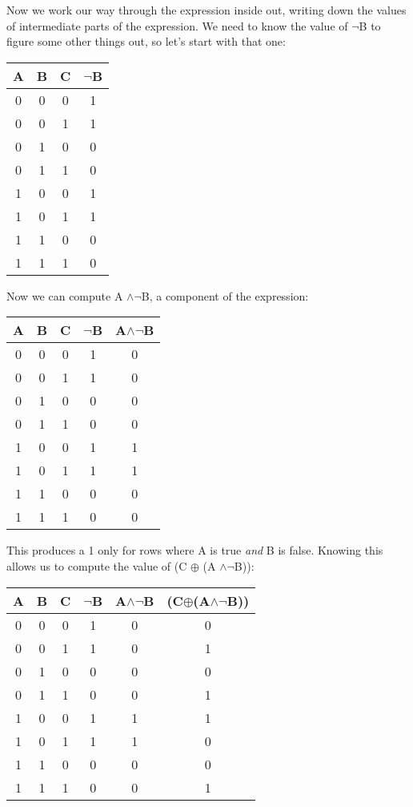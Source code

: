 Now we work our way through the expression inside out, writing down the
values of intermediate parts of the expression. We need to know the value
of $\neg$B to figure some other things out, so let's start with that one:
\begin{nobreak}
\begin{center}
\begin{tabular}{c c c|c}
A & B & C & $\neg$B \\
\hline
0 & 0 & 0 & 1 \\
0 & 0 & 1 & 1 \\
0 & 1 & 0 & 0 \\
0 & 1 & 1 & 0 \\
1 & 0 & 0 & 1 \\
1 & 0 & 1 & 1 \\
1 & 1 & 0 & 0 \\
1 & 1 & 1 & 0 \\
\end{tabular}
\end{center}
\end{nobreak}
\pagebreak
\begin{nobreak}
Now we can compute A $\wedge \neg$B, a component of the expression:
\begin{center}
\begin{tabular}{c c c|c c}
A & B & C & $\neg$B & A$\wedge \neg$B\\
\hline
0 & 0 & 0 & 1 & 0 \\
0 & 0 & 1 & 1 & 0 \\
0 & 1 & 0 & 0 & 0 \\
0 & 1 & 1 & 0 & 0 \\
1 & 0 & 0 & 1 & 1 \\
1 & 0 & 1 & 1 & 1 \\
1 & 1 & 0 & 0 & 0 \\
1 & 1 & 1 & 0 & 0 \\
\end{tabular}
\end{center}
\end{nobreak}
This produces a 1 only for rows where A is true \textit{and} B is false.
Knowing this allows us to compute the value of (C $\oplus$ (A $\wedge
\neg$B)):
\begin{nobreak}
\begin{center}
\begin{tabular}{c c c|c c c}
A & B & C & $\neg$B & A$\wedge \neg$B & (C$\oplus$(A$\wedge \neg$B)) \\
\hline
0 & 0 & 0 & 1 & 0 & 0 \\
0 & 0 & 1 & 1 & 0 & 1 \\
0 & 1 & 0 & 0 & 0 & 0 \\
0 & 1 & 1 & 0 & 0 & 1 \\
1 & 0 & 0 & 1 & 1 & 1 \\
1 & 0 & 1 & 1 & 1 & 0 \\
1 & 1 & 0 & 0 & 0 & 0 \\
1 & 1 & 1 & 0 & 0 & 1 \\
\end{tabular}
\end{center}
\end{nobreak}
